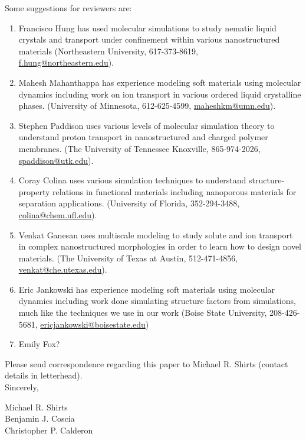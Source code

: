 \documentclass[fontsize=11pt]{article}
\begin{document}
	\noindent Some suggestions for reviewers are:
	\begin{enumerate}
	
		\item Francisco Hung has used molecular simulations to study nematic liquid crystals
		and transport under confinement within various nanostructured materials 
		(Northeastern University, 617-373-8619,\\ \href{mailto:f.hung@northeastern.edu}{f.hung@northeastern.edu}).
		
		\item Mahesh Mahanthappa has experience modeling soft materials using molecular dynamics
		including work on ion transport in various ordered liquid crystalline phases. 
		(University of Minnesota, 612-625-4599, \href{mailto:maheshkm@umn.edu}{maheshkm@umn.edu}).
		
		\item Stephen Paddison uses various levels of molecular simulation theory to understand
		proton transport in nanostructured and charged polymer membranes. (The University of Tennessee 
		Knoxville, 865-974-2026, \href{mailto:spaddison@utk.edu}{spaddison@utk.edu}).
		
		\item Coray Colina uses various simulation techniques to understand structure-property relations
		in functional materials including nanoporous materials for separation applications. (University
		of Florida, 352-294-3488, \href{mailto:colina@chem.ufl.edu}{colina@chem.ufl.edu}).
		
		\item Venkat Ganesan uses multiscale modeling to study solute and ion transport in complex
		nanostructured morphologies in order to learn how to design novel materials. (The University
		of Texas at Austin, 512-471-4856, \href{mailto:venkat@che.utexas.edu}{venkat@che.utexas.edu}).
		
		\item Eric Jankowski has experience modeling soft materials using molecular dynamics
		including work done simulating structure factors from simulations, much like
		the techniques we use in our work (Boise State University, 208-426-5681,
		\href{mailto:ericjankowski@boisestate.edu}{ericjankowski@boisestate.edu})
		
		\item Emily Fox?  %
		
	\end{enumerate}
	
	\noindent Please send correspondence regarding this paper to Michael R. Shirts (contact
	details in letterhead).\\	
	
	\noindent Sincerely,
	
	\noindent Michael R. Shirts \\
	\noindent Benjamin J. Coscia \\
	\noindent Christopher P. Calderon \\
	
\end{document}
